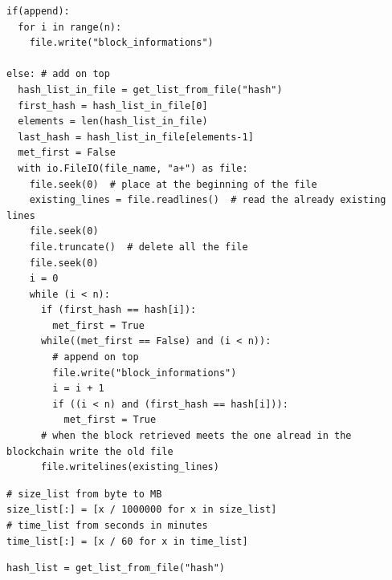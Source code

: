 \documentclass[USenglish]{uit-thesis}
\begin{document}
\begin{appendices}
\begin{lstlisting}[float, caption={How the file.write is performed in the blockchain analytics system. Differences with add and append.}]
if(append):
  for i in range(n):
    file.write("block_informations")

else: # add on top
  hash_list_in_file = get_list_from_file("hash")
  first_hash = hash_list_in_file[0]
  elements = len(hash_list_in_file)
  last_hash = hash_list_in_file[elements-1]
  met_first = False
  with io.FileIO(file_name, "a+") as file:
    file.seek(0)  # place at the beginning of the file
    existing_lines = file.readlines()  # read the already existing lines
    file.seek(0)
    file.truncate()  # delete all the file
    file.seek(0)
    i = 0
    while (i < n):
      if (first_hash == hash[i]):
        met_first = True
      while((met_first == False) and (i < n)):
        # append on top
        file.write("block_informations")
        i = i + 1
        if ((i < n) and (first_hash == hash[i])):
          met_first = True
      # when the block retrieved meets the one alread in the blockchain write the old file
      file.writelines(existing_lines)

\end{lstlisting}

\begin{lstlisting}[float, caption={Changing all the values inside a Python list in one code line.}]
# size_list from byte to MB
size_list[:] = [x / 1000000 for x in size_list]
# time_list from seconds in minutes
time_list[:] = [x / 60 for x in time_list]
\end{lstlisting}


\begin{lstlisting}[float, caption={Method that allows, given an attribute present in the blockchain.txt file, to create a list containing informations only about this quality using \emph{regular expressions}.}]
hash_list = get_list_from_file("hash")


\end{lstlisting}
\end{appendices}
\end{document}
